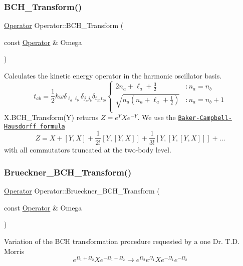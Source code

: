 \subsubsection{\texorpdfstring{B\+C\+H\+\_\+\+Transform()}{BCH\_Transform()}}
{\footnotesize\ttfamily \hyperlink{classOperator}{Operator} Operator\+::\+B\+C\+H\+\_\+\+Transform (\begin{DoxyParamCaption}\item[{const \hyperlink{classOperator}{Operator} \&}]{Omega }\end{DoxyParamCaption})}

Calculates the kinetic energy operator in the harmonic oscillator basis. \[ t_{ab} = \frac{1}{2}\hbar\omega \delta_{\ell_a \ell_b} \delta_{j_aj_b} \delta_{t_{za}t_{zb}} \left\{ \begin{array}{ll} 2n_a + \ell_a + \frac{3}{2} &: n_a=n_b\\ \sqrt{n_{a}(n_{a}+\ell_a + \frac{1}{2})} &: n_a=n_b+1\\ \end{array} \right. \] X.\+B\+C\+H\+\_\+\+Transform(\+Y) returns $ Z = e^{Y} X e^{-Y} $. We use the \href{http://en.wikipedia.org/wiki/Baker-Campbell-Hausdorff_formula}{\tt Baker-\/\+Campbell-\/\+Hausdorff formula} \[ Z = X + [Y,X] + \frac{1}{2!}[Y,[Y,X]] + \frac{1}{3!}[Y,[Y,[Y,X]]] + \ldots \] with all commutators truncated at the two-\/body level. \mbox{\label{classOperator_a088a5326a1c82e520b8bcdd4dc25175a}} 
\subsubsection{\texorpdfstring{Brueckner\+\_\+\+B\+C\+H\+\_\+\+Transform()}{Brueckner\_BCH\_Transform()}}
{\footnotesize\ttfamily \hyperlink{classOperator}{Operator} Operator\+::\+Brueckner\+\_\+\+B\+C\+H\+\_\+\+Transform (\begin{DoxyParamCaption}\item[{const \hyperlink{classOperator}{Operator} \&}]{Omega }\end{DoxyParamCaption})}

Variation of the B\+CH transformation procedure requested by a one Dr. T.\+D. Morris \[ e^{\Omega_1 + \Omega_2} X e^{-\Omega_1 - \Omega_2} \rightarrow e^{\Omega_2} e^{\Omega_1} X e^{-\Omega_1} e^{-\Omega_2} \] \mbox{\label{classOperator_a39adf2f2f225609606da088b59e3502a}} 
